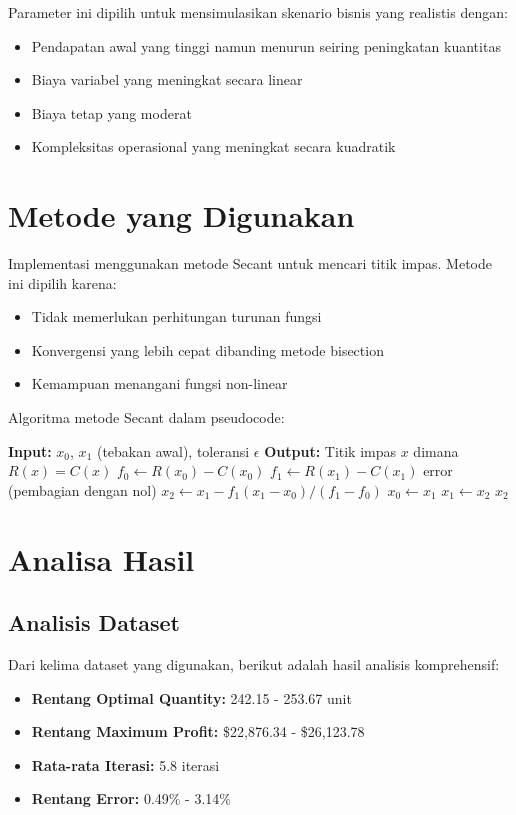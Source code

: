 \documentclass[conference]{IEEEtran}
\begin{document}
Parameter ini dipilih untuk mensimulasikan skenario bisnis yang realistis dengan:
\begin{itemize}
\item Pendapatan awal yang tinggi namun menurun seiring peningkatan kuantitas
\item Biaya variabel yang meningkat secara linear
\item Biaya tetap yang moderat
\item Kompleksitas operasional yang meningkat secara kuadratik
\end{itemize}

\section{Metode yang Digunakan}
Implementasi menggunakan metode Secant untuk mencari titik impas. Metode ini dipilih karena:
\begin{itemize}
\item Tidak memerlukan perhitungan turunan fungsi
\item Konvergensi yang lebih cepat dibanding metode bisection
\item Kemampuan menangani fungsi non-linear
\end{itemize}

Algoritma metode Secant dalam pseudocode:
\begin{algorithmic}
\STATE \textbf{Input:} $x_0$, $x_1$ (tebakan awal), toleransi $\epsilon$
\STATE \textbf{Output:} Titik impas $x$ dimana $R(x) = C(x)$
\REPEAT
    \STATE $f_0 \leftarrow R(x_0) - C(x_0)$
    \STATE $f_1 \leftarrow R(x_1) - C(x_1)$
        \RETURN error (pembagian dengan nol)
    \ENDIF
    \STATE $x_2 \leftarrow x_1 - f_1(x_1 - x_0)/(f_1 - f_0)$
    \STATE $x_0 \leftarrow x_1$
    \STATE $x_1 \leftarrow x_2$
\RETURN $x_2$
\end{algorithmic}

\section{Analisa Hasil}
\subsection{Analisis Dataset}
Dari kelima dataset yang digunakan, berikut adalah hasil analisis komprehensif:

\begin{itemize}
\item \textbf{Rentang Optimal Quantity:} 242.15 - 253.67 unit
\item \textbf{Rentang Maximum Profit:} \$22,876.34 - \$26,123.78
\item \textbf{Rata-rata Iterasi:} 5.8 iterasi
\item \textbf{Rentang Error:} 0.49\% - 3.14\%
\end{itemize}
\end{document}
